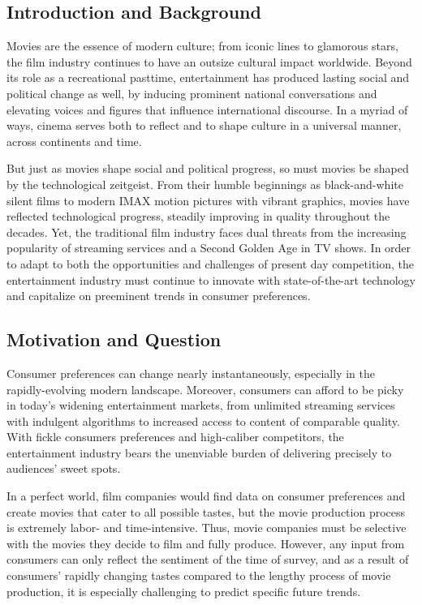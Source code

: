 \documentclass[12pt]{article}
\begin{document}
\subsection{Introduction and Background}
Movies are the essence of modern culture; from iconic lines to glamorous stars, the film industry continues to have an outsize cultural impact worldwide. Beyond its role as a recreational pasttime, entertainment has produced lasting social and political change as well, by inducing prominent national conversations and elevating voices and figures that influence international discourse. In a myriad of ways, cinema serves both to reflect and to shape culture in a universal manner, across continents and time.

But just as movies shape social and political progress, so must movies be shaped by the technological zeitgeist. From their humble beginnings as black-and-white silent films to modern IMAX motion pictures with vibrant graphics, movies have reflected technological progress, steadily improving in quality throughout the decades. Yet, the traditional film industry faces dual threats from the increasing popularity of streaming services and a Second Golden Age in TV shows. In order to adapt to both the opportunities and challenges of present day competition, the entertainment industry must continue to innovate with state-of-the-art technology and capitalize on preeminent trends in consumer preferences.

\subsection{Motivation and Question}

Consumer preferences can change nearly instantaneously, especially in the rapidly-evolving modern landscape. Moreover, consumers can afford to be picky in today's widening entertainment markets, from unlimited streaming services with indulgent algorithms to increased access to content of comparable quality. With fickle consumers preferences and high-caliber competitors, the entertainment industry bears the unenviable burden of  delivering precisely to audiences' sweet spots.

In a perfect world, film companies would find data on consumer preferences and create movies that cater to all possible tastes, but the movie production process is extremely labor- and time-intensive. Thus, movie companies must be selective with the movies they decide to film and fully produce. However, any input from consumers can only reflect the sentiment of the time of survey, and as a result of consumers' rapidly changing tastes compared to the lengthy process of movie production, it is especially challenging to predict specific future trends.
\end{document}
